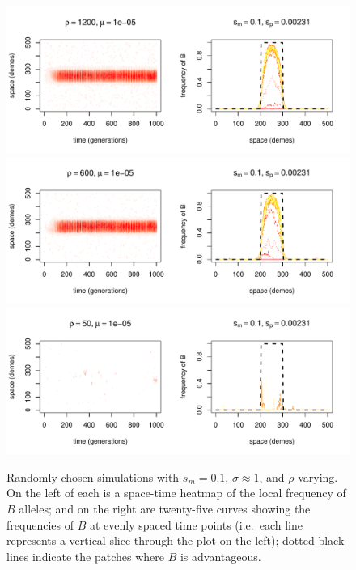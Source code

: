 \documentclass{article}
\begin{document}
\begin{figure}
  \begin{center}
    \includegraphics{example-mutation-sims/18885-r1-501-sb0_01-sm-0_1-N1200-pophistory-run}
    \includegraphics{example-mutation-sims/56325-r1-501-sb0_01-sm-0_1-N600-pophistory-run}
    \includegraphics{example-mutation-sims/28432-r1-501-sb0_01-sm-0_1-N50-pophistory-run}
  \end{center}
  \caption{
    Randomly chosen simulations with $s_m=0.1$, $\sigma\approx 1$, and $\rho$ varying.
    On the left of each is a space-time heatmap of the local frequency of $B$ alleles;
    and on the right are twenty-five curves showing the frequencies of $B$ at evenly spaced time points
    (i.e.\ each line represents a vertical slice through the plot on the left);
    dotted black lines indicate the patches where $B$ is advantageous.
  } \label{sfig:sims_1}
\end{figure}
\end{document}
